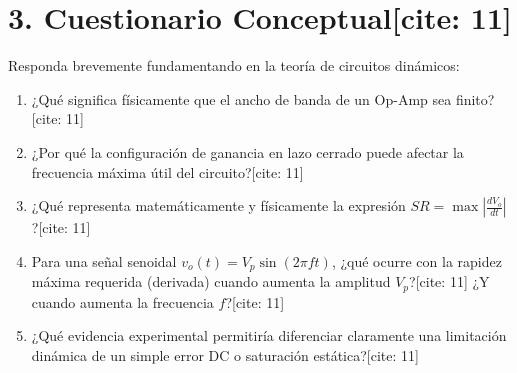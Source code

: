 \documentclass[11pt, a4paper]{article}
\begin{document}
\section*{3. Cuestionario Conceptual[cite: 11]}
Responda brevemente fundamentando en la teoría de circuitos dinámicos:
\begin{enumerate}
    \item ¿Qué significa físicamente que el ancho de banda de un Op-Amp sea finito?[cite: 11]
    \item ¿Por qué la configuración de ganancia en lazo cerrado puede afectar la frecuencia máxima útil del circuito?[cite: 11]
    \item ¿Qué representa matemáticamente y físicamente la expresión $SR = \max\left|\frac{dV_o}{dt}\right|$?[cite: 11]
    \item Para una señal senoidal $v_o(t) = V_p\sin(2\pi ft)$, ¿qué ocurre con la rapidez máxima requerida (derivada) cuando aumenta la amplitud $V_p$?[cite: 11] ¿Y cuando aumenta la frecuencia $f$?[cite: 11]
    \item ¿Qué evidencia experimental permitiría diferenciar claramente una limitación dinámica de un simple error DC o saturación estática?[cite: 11]
\end{enumerate}
\end{document}
